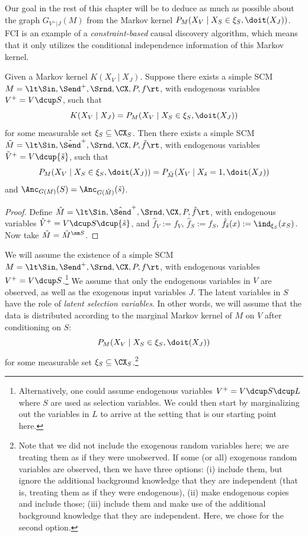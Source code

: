 Our goal in the rest of this chapter will be to deduce as much as possible about the graph $G_{V^+|J}(M)$ from the Markov kernel $P_{M}(X_V \mid X_S \in \xi_S, \doit(X_J))$. 
FCI is an example of a \emph{constraint-based} causal discovery algorithm, which means that it only utilizes the conditional independence information of this Markov kernel.

\begin{Prp}
  Given a Markov kernel $K(X_V \mid X_J)$.
  Suppose there exists a simple SCM $M = \lt \Sin, \Send^+, \Srnd, \CX, P, f \rt$, with endogenous variables $V^+ = V \dcup S$,
  such that
  $$K(X_V \mid X_J) = P_M(X_V \mid X_S \in \xi_S, \doit(X_J))$$
  for some measurable set $\xi_S \subseteq \CX_S$.
  Then there exists a simple SCM $\tilde{M} = \lt \Sin, \tilde\Send^+, \Srnd, \CX, P, \tilde{f} \rt$, with endogenous variables $\tilde{V}^+ = V \dcup \{\tilde{s}\}$,
  such that
  $$P_M(X_V \mid X_S \in \xi_S, \doit(X_J)) = P_{\tilde M}(X_V \mid X_{\tilde s} = 1, \doit(X_J))$$
  and $\Anc_{G(M)}(S) = \Anc_{G(\tilde{M})}(\tilde{s})$.
\end{Prp}
\begin{proof}
  Define $\hat{M} = \lt \Sin, \hat\Send^+, \Srnd, \CX, P, \hat{f} \rt$, with endogenous variables $\hat{V}^+ = V \dcup S \dcup \{\tilde{s}\}$,
  and $\hat{f}_V := f_V$, $\hat{f}_S := f_S$, $\hat{f}_{\tilde{s}}(x) := \ind_{\xi_S}(x_{S})$.
  Now take $\tilde{M} = \hat{M}^{\sm S}$.
\end{proof}

\begin{Not}
We will assume the existence of a simple SCM $M = \lt \Sin, \Send^+, \Srnd, \CX, P, f \rt$, with endogenous variables $V^+ = V \dcup S$.\footnote{Alternatively, one could assume endogenous variables $V^+ = V \dcup S \dcup L$ where $S$ are used as selection variables. We could then start by marginalizing out the variables in $L$ to arrive at the setting that is our starting point here.}
We assume that only the endogenous variables in $V$ are observed, as well as the exogenous input variables $J$.
The latent variables in $S$ have the role of \emph{latent selection variables}.
In other words, we will assume that the data is distributed according to the marginal Markov kernel of $M$ on $V$ after conditioning on $S$:
$$P_M(X_V \mid X_S \in \xi_S, \doit(X_J))$$
for some measurable set $\xi_S \subseteq \CX_S$.\footnote{Note that we did not include the exogenous random variables here; we are treating them as if they were unobserved. If some (or all) exogenous random variables are observed, then we have three options: (i) include them, but ignore the additional background knowledge that they are independent (that is, treating them as if they were endogenous), (ii) make endogenous copies and include those; (iii) include them and make use of the additional background knowledge that they are independent. Here, we chose for the second option.}
\end{Not}

